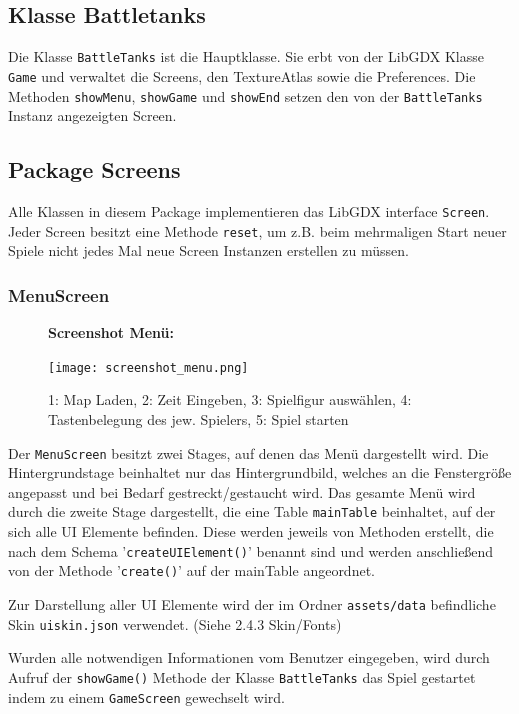 \documentclass[a4paper]{scrreprt}
\def\code#1{\texttt{#1}}
\begin{document}
\subsection{Klasse Battletanks}
Die Klasse \code{BattleTanks} ist die Hauptklasse. Sie erbt von der LibGDX Klasse \code{Game} und verwaltet die Screens, den TextureAtlas sowie die Preferences.
Die Methoden \code{showMenu}, \code{showGame} und \code{showEnd} setzen den von der \code{BattleTanks} Instanz angezeigten Screen.

\newpage
\subsection{Package Screens}
Alle Klassen in diesem Package implementieren das LibGDX interface \code{Screen}. Jeder Screen besitzt eine Methode \code{reset}, um z.B. beim mehrmaligen Start neuer Spiele nicht jedes Mal neue Screen Instanzen erstellen zu müssen.
\subsubsection{MenuScreen}
\begin{figure}[H]
  \textbf{Screenshot Menü:}\par\medskip
  \centering
\texttt{[image: screenshot\_menu.png]}
\caption{1: Map Laden, 2: Zeit Eingeben, 3: Spielfigur auswählen, 4: Tastenbelegung des jew. Spielers,
5: Spiel starten}
\end{figure}


Der \code{MenuScreen} besitzt zwei Stages, auf denen das Menü dargestellt wird. Die Hintergrundstage beinhaltet nur das Hintergrundbild, welches an die Fenstergröße angepasst und bei Bedarf gestreckt/gestaucht wird.
Das gesamte Menü wird durch die zweite Stage dargestellt, die eine Table \code{mainTable} beinhaltet, auf der sich alle UI Elemente befinden. Diese werden jeweils von Methoden erstellt, die nach dem Schema '\code{createUIElement()}' benannt sind und werden anschließend von der Methode '\code{create()}' auf der mainTable angeordnet.


Zur Darstellung aller UI Elemente wird der im Ordner \code{assets/data} befindliche Skin \code{uiskin.json} verwendet. (Siehe 2.4.3 Skin/Fonts)

Wurden alle notwendigen Informationen vom Benutzer eingegeben, wird durch Aufruf der \code{showGame()} Methode der Klasse \code{BattleTanks} das Spiel gestartet indem zu einem \code{GameScreen} gewechselt wird.


\newpage
\end{document}
